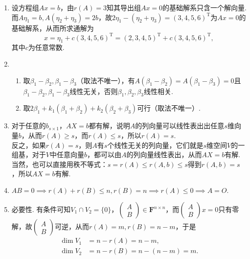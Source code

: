 \begin{enumerate}
    \item
        设方程组$Ax=b$，由$r(A)=3$知其导出组$Ax=0$的基础解系只含一个解向量.\\
        而$A\eta_1=b,A(\eta_2+\eta_3)=2b$，故$2\eta_1-(\eta_2+\eta_3)=(3,4,5,6)^\mathrm{T}$为$Ax=0$的基础解系，从而所求通解为
        \begin{equation*}
            x = \eta_1+c(3,4,5,6)^\mathrm{T} = (2,3,4,5)^\mathrm{T} + c(3,4,5,6)^\mathrm{T},
        \end{equation*}
        其中$c$为任意常数.
    \item
        \begin{enumerate}
            \item 取$\beta_1-\beta_2,\beta_1-\beta_3$（取法不唯一），有$A(\beta_1-\beta_2)=A(\beta_1-\beta_3)=0$且$\beta_1-\beta_2,\beta_1-\beta_3$线性无关，否则$\beta_1,\beta_2,\beta_3$线性相关.
            \item 取$2\beta_1+k_1(\beta_1+\beta_2)+k_2(\beta_2+\beta_3)$可行（取法不唯一）.
        \end{enumerate}
    \item
        对于任意的$b_{s\times 1}$，$AX=b$都有解，说明$A$的列向量可以线性表出出任意$s$维向量$b$，从而$r(A)\geqslant s$，而$r(A)\leqslant s$，所以$r(A)=s$.\\
        反之，如果$r(A)=s$，则$A$有$s$个线性无关的列向量，它们就是$s$维空间$V$的一组基，对于$V$中任意向量$b$，都可以由$A$的列向量线性表出，从而$AX=b$有解.\\
        当然，也可以直接用秩不等式：$s=r(A)\leqslant r(A,b)\leqslant s$得到$r(A,b)=s$，所以$AX=b$有解.
    \item
        $AB=0\implies r(A)+r(B)\leqslant n,r(B)=n\implies r(A)\leqslant 0\implies A=O.$
    \item
        必要性. 有条件可知$V_1\cap V_2=\{0\}$，$\begin{pmatrix}A\\B\end{pmatrix}\in\mathbf{F}^{n\times n}$，而$\begin{pmatrix}A\\B\end{pmatrix}x=0$只有零解，故$\begin{pmatrix}A\\B\end{pmatrix}$可逆，从而$r(A)=m,r(B)=n-m$，于是
        \begin{align*}
            \dim V_1&=n-r(A)=n-m, \\
            \dim V_2&=n-r(B)=n-(n-m)=m.
        \end{align*}

\end{enumerate}
